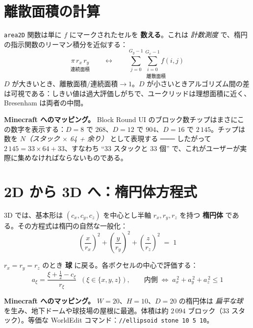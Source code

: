 \documentclass[12pt,a4paper]{scrartcl}
\newcommand{\code}[1]{\texttt{\small #1}}
\newcommand{\acc}[1]{\textcolor{accent}{\textbf{#1}}}
\newcommand{\cmd}[1]{\textcolor{earth}{\texttt{\small #1}}}
\begin{document}
\section{離散面積の計算}

\code{area2D} 関数は単に $f$ にマークされたセルを \acc{数える}。これは \emph{計数測度} で、楕円の指示関数のリーマン積分を近似する：
\[
\underset{\text{連続面積}}{\pi \, r_x \, r_y}
\qquad\longleftrightarrow\qquad
\underset{\text{離散面積}}{\sum_{j=0}^{G_y-1}\sum_{i=0}^{G_x-1} f(i,j)}
\]
$D$ が大きいとき、$\text{離散面積} / \text{連続面積} \to 1$。$D$ が小さいときアルゴリズム間の差は可視である：しきい値は過大評価しがちで、ユークリッドは理想面積に近く、Bresenham は両者の中間。

\begin{minec}
\textbf{Minecraft へのマッピング。} Block Round UI のブロック数チップはまさにこの数字を表示する：$D=8$ で $268$、$D=12$ で $904$、$D=16$ で $2\,145$。チップは数を \emph{$N$（スタック $\times$ 64 + 余り）} として表現する ─── したがって $2\,145 = 33 \times 64 + 33$、すなわち \enquote{$33$ スタックと $33$ 個} で、これがユーザーが実際に集めなければならないものである。
\end{minec}

\section{2D から 3D へ：楕円体方程式}

3D では、基本形は $(c_x, c_y, c_z)$ を中心とし半軸 $r_x, r_y, r_z$ を持つ \acc{楕円体} である。その方程式は楕円の自然な一般化：
\[
\left(\dfrac{x}{r_x}\right)^{\!2} + \left(\dfrac{y}{r_y}\right)^{\!2} + \left(\dfrac{z}{r_z}\right)^{\!2} \;=\; 1
\]

$r_x = r_y = r_z$ のとき \acc{球} に戻る。各ボクセルの中心で評価する：
\[
a_\xi = \frac{\xi + \tfrac{1}{2} - c_\xi}{r_\xi}\;\;(\xi \in \{x,y,z\}),
\qquad
\text{内側}\;\Longleftrightarrow\;a_x^{\,2} + a_y^{\,2} + a_z^{\,2} \leq 1
\]

\begin{minec}
\textbf{Minecraft へのマッピング。} $W=20$、$H=10$、$D=20$ の楕円体は \emph{扁平な球} を生み、地下ドームや球技場の屋根に最適。体積は約 $2\,094$ ブロック（$33$ スタック）。等価な WorldEdit コマンド：\cmd{//ellipsoid stone 10 5 10}。
\end{minec}
\end{document}
